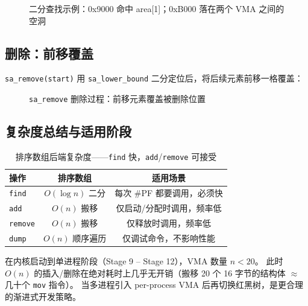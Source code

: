\begin{figure}[H]
  \centering
  
  \caption{二分查找示例：0x9000 命中 area[1]；0xB000 落在两个 VMA 之间的空洞}
  \label{fig:vma-sa-find}
\end{figure}

\subsection{删除：前移覆盖}

\texttt{sa\_remove(start)} 用 \texttt{sa\_lower\_bound} 二分定位后，将后续元素前移一格覆盖：

\begin{figure}[H]
  \centering
  
  \caption{\texttt{sa\_remove} 删除过程：前移元素覆盖被删除位置}
  \label{fig:vma-sa-remove}
\end{figure}

\subsection{复杂度总结与适用阶段}

\begin{table}[H]
\centering
\begin{tabular}{lcc}
\toprule
\textbf{操作} & \textbf{排序数组} & \textbf{适用场景} \\
\midrule
\texttt{find}   & $O(\log n)$ 二分    & 每次 \#PF 都要调用，必须快 \\
\texttt{add}    & $O(n)$ 搬移        & 仅启动/分配时调用，频率低 \\
\texttt{remove} & $O(n)$ 搬移        & 仅释放时调用，频率低 \\
\texttt{dump}   & $O(n)$ 顺序遍历    & 仅调试命令，不影响性能 \\
\bottomrule
\end{tabular}
\caption{排序数组后端复杂度——\texttt{find} 快，\texttt{add}/\texttt{remove} 可接受}
\label{tab:vma-sa-complexity}
\end{table}

在内核启动到单进程阶段（Stage 9 -- Stage 12），VMA 数量 $n < 20$。
此时 $O(n)$ 的插入/删除在绝对耗时上几乎无开销（搬移 20 个 16 字节的结构体 $\approx$ 几十个 \texttt{mov} 指令）。
当多进程引入 per-process VMA 后再切换红黑树，是更合理的渐进式开发策略。


